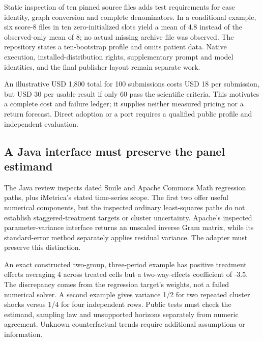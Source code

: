 Static inspection of ten pinned source files adds test requirements for
case identity, graph conversion and complete denominators. In a
conditional example, six score-8 files in ten zero-initialized slots
yield a mean of 4.8 instead of the observed-only mean of 8; no actual
missing archive file was observed. The repository states a ten-bootstrap
profile and omits patient data. Native execution, installed-distribution
rights, supplementary prompt and model identities, and the final
publisher layout remain separate work.
\citep{exec24_ecmo_code,exec24_ecmo_reference}

An illustrative USD 1,800 total for 100 submissions costs USD 18 per
submission, but USD 30 per usable result if only 60 pass the scientific
criteria. This motivates a complete cost and failure ledger; it supplies
neither measured pricing nor a return forecast. Direct adoption or a
port requires a qualified public profile and independent evaluation.
\citep{exec24_ecmo_reference}

\hypertarget{a-java-interface-must-preserve-the-panel-estimand}{%
\subsection{A Java interface must preserve the panel
estimand}\label{a-java-interface-must-preserve-the-panel-estimand}}

The Java review inspects dated Smile and Apache Commons Math regression
paths, plus iMetrica's stated time-series scope. The first two offer
useful numerical components, but the inspected ordinary least-squares
paths do not establish staggered-treatment targets or cluster
uncertainty. Apache's inspected parameter-variance interface returns an
unscaled inverse Gram matrix, while its standard-error method separately
applies residual variance. The adapter must preserve this distinction.
\citep{exec25_paneljava_smile,exec25_paneljava_commons,exec25_paneljava_imetrica}

An exact constructed two-group, three-period example has positive
treatment effects averaging 4 across treated cells but a two-way-effects
coefficient of -3.5. The discrepancy comes from the regression target's
weights, not a failed numerical solver. A second example gives variance
1/2 for two repeated cluster shocks versus 1/4 for four independent
rows. Public tests must check the estimand, sampling law and unsupported
horizons separately from numeric agreement. Unknown counterfactual
trends require additional assumptions or information.
\citep{exec25_paneljava_reference}

